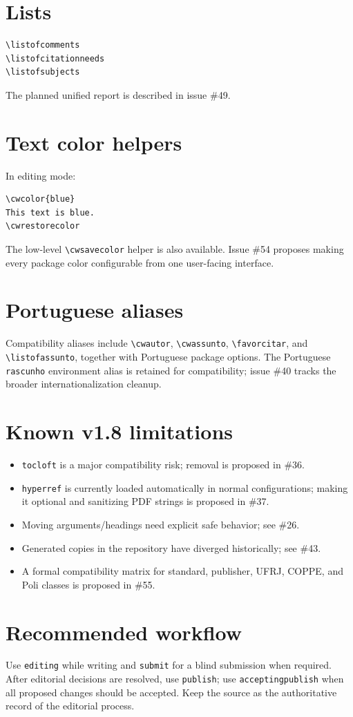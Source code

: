 \documentclass[11pt]{article}
\newcommand{\cmd}[1]{\texttt{\textbackslash#1}}
\newcommand{\opt}[1]{\texttt{#1}}
\begin{document}
\section*{Lists}

\begin{verbatim}
\listofcomments
\listofcitationneeds
\listofsubjects
\end{verbatim}

The planned unified report is described in issue \#49.

\section*{Text color helpers}

In editing mode:

\begin{verbatim}
\cwcolor{blue}
This text is blue.
\cwrestorecolor
\end{verbatim}

The low-level \cmd{cwsavecolor} helper is also available. Issue \#54 proposes making every package color configurable from one user-facing interface.

\section*{Portuguese aliases}

Compatibility aliases include \cmd{cwautor}, \cmd{cwassunto}, \cmd{favorcitar}, and \cmd{listofassunto}, together with Portuguese package options. The Portuguese \texttt{rascunho} environment alias is retained for compatibility; issue \#40 tracks the broader internationalization cleanup.

\section*{Known v1.8 limitations}

\begin{itemize}
\item \texttt{tocloft} is a major compatibility risk; removal is proposed in \#36.
\item \texttt{hyperref} is currently loaded automatically in normal configurations; making it optional and sanitizing PDF strings is proposed in \#37.
\item Moving arguments/headings need explicit safe behavior; see \#26.
\item Generated copies in the repository have diverged historically; see \#43.
\item A formal compatibility matrix for standard, publisher, UFRJ, COPPE, and Poli classes is proposed in \#55.
\end{itemize}

\section*{Recommended workflow}

Use \opt{editing} while writing and \opt{submit} for a blind submission when required. After editorial decisions are resolved, use \opt{publish}; use \opt{acceptingpublish} when all proposed changes should be accepted. Keep the source as the authoritative record of the editorial process.
\end{document}
